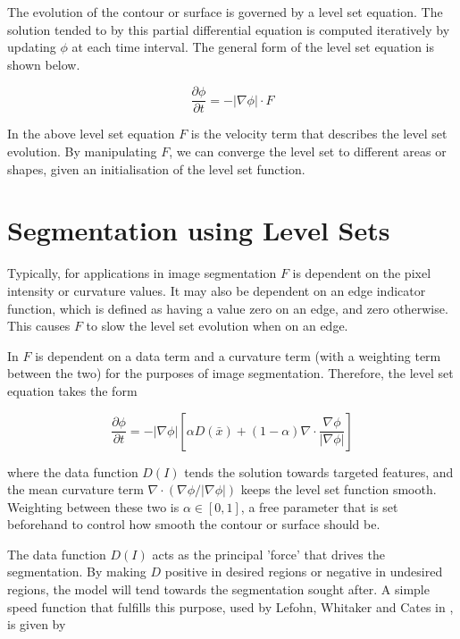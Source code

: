 The evolution of the contour or surface is governed by a level set equation. The solution tended to by this partial differential equation is computed iteratively by updating $\phi$ at each time interval. The general form of the level set equation is shown below.

	\begin{equation}
	\frac{\partial{\phi}}{\partial{t}}=-|\nabla{\phi|}\cdot F
	\label{eq:levelsetequation}
	\end{equation}

In the above level set equation $F$ is the velocity term that describes the level set evolution. By manipulating $F$, we can converge the level set to different areas or shapes, given an initialisation of the level set function. 

\section{Segmentation using Level Sets}
Typically, for applications in image segmentation $F$ is dependent on the pixel intensity or curvature values. It may also be dependent on an edge indicator function, which is defined as having a value zero on an edge, and zero otherwise. This causes $F$ to slow the level set evolution when on an edge.

In \cite{Lefohn04astreaming} $F$ is dependent on a data term and a curvature term (with a weighting term between the two) for the purposes of image segmentation. Therefore, the level set equation takes the form

	\begin{equation}
	\frac{\partial{\phi}}{\partial{t}}=-|\nabla{\phi}|\left[\alpha D(\bar{x})  + (1-\alpha)\nabla \cdot{\frac{\nabla{\phi}}{|\nabla{\phi|}}}\right]
	\label{eq:fulllevelsetequation}
	\end{equation}

where the data function $D(I)$ tends the solution towards targeted features, and the mean curvature term $\nabla \cdot{(\nabla{\phi}/|\nabla{\phi|})}$ keeps the level set function smooth. Weighting between these two is $\alpha \in [0,1]$, a free parameter that is set beforehand to control how smooth the contour or surface should be.

The data function $D(I)$ acts as the principal 'force' that drives the segmentation. By making $D$ positive in desired regions or negative in undesired regions, the model will tend towards the segmentation sought after. A simple speed function that fulfills this purpose, used by Lefohn, Whitaker and Cates in \cite{Lefohn04astreaming, gist}, is given by

